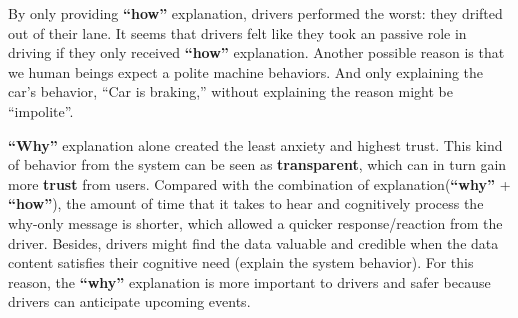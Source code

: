     \indent By only providing \textbf{``how''} explanation, drivers performed the worst: they drifted out of their lane.
    It seems that drivers felt like they took an passive role in driving if they only received \textbf{``how''} explanation.
    Another possible reason is that we human beings expect a polite machine behaviors\cite{reeves1996people}.
    And only explaining the car’s behavior, ``Car is braking,'' without explaining the reason might be “impolite”.
    
    \indent \textbf{``Why''} explanation alone created the least anxiety and highest trust. This kind of behavior from the system
    can be seen as \textbf{transparent}, which can in turn gain more \textbf{trust} from users. 
    Compared with the combination of explanation(\textbf{``why''} + \textbf{``how''}), 
    the amount of time that it takes to hear and cognitively process the why-only message is shorter, 
    which allowed a quicker response/reaction from the driver. Besides, drivers might find the data valuable and credible when the data content satisfies their cognitive need (explain the system behavior).
    For this reason, the \textbf{``why''} explanation is more important to drivers and safer because drivers can anticipate upcoming events\cite{koo2015did}.
